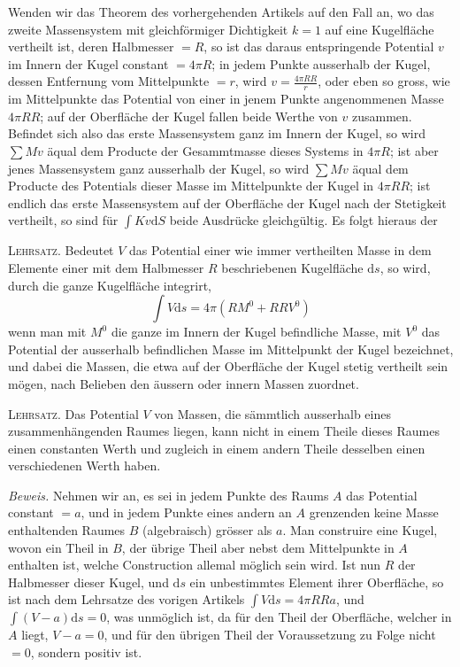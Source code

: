 Wenden wir das Theorem des vorhergehenden Artikels auf den Fall an, wo das zweite Massensystem mit gleichförmiger Dichtigkeit $k=1$ auf eine Kugelfläche vertheilt ist, deren Halbmesser $=R$, so ist das daraus entspringende Potential $v$ im Innern der Kugel constant $=4\pi R$; in jedem Punkte ausserhalb der Kugel, dessen Entfernung vom Mittelpunkte $=r$, wird $v=\frac{4\pi RR}{r}$, oder eben so gross, wie im Mittelpunkte das Potential von einer in jenem Punkte angenommenen Masse $4\pi RR$; auf der Oberfläche der Kugel fallen beide Werthe von $v$ zusammen. Befindet sich also das erste Massensystem ganz im Innern der Kugel, so wird $\sum Mv$ äqual dem Producte der Gesammtmasse dieses Systems in $4\pi R$; ist aber jenes Massensystem ganz ausserhalb der Kugel, so wird $\sum Mv$ äqual dem Producte des Potentials dieser Masse im Mittelpunkte der Kugel in $4\pi RR$; ist endlich das erste Massensystem auf der Oberfläche der Kugel nach der Stetigkeit vertheilt, so sind für $\int Kv\mathrm dS$ beide Ausdrücke gleichgültig. Es folgt hieraus der

\textsc{Lehrsatz.} Bedeutet $V$ das Potential einer wie immer vertheilten Masse in dem Elemente einer mit dem Halbmesser $R$ beschriebenen Kugelfläche $\mathrm ds$, so wird, durch die ganze Kugelfläche integrirt,
\[
\int V\mathrm ds=4\pi(RM^0+RRV^0)
\]
wenn man mit $M^0$ die ganze im Innern der Kugel befindliche Masse, mit $V^0$ das Potential der ausserhalb befindlichen Masse im Mittelpunkt der Kugel bezeichnet, und dabei die Massen, die etwa auf der Oberfläche der Kugel stetig vertheilt sein mögen, nach Belieben den äussern oder innern Massen zuordnet.

%
\textsc{Lehrsatz.} Das Potential $V$ von Massen, die sämmtlich ausserhalb eines zusammenhängenden Raumes liegen, kann nicht in einem Theile dieses Raumes einen constanten Werth und zugleich in einem andern Theile desselben einen verschiedenen Werth haben.

\textit{Beweis.} Nehmen wir an, es sei in jedem Punkte des Raums $A$ das Potential constant $=a$, und in jedem Punkte eines andern an $A$ grenzenden keine Masse enthaltenden Raumes $B$ (algebraisch) grösser als $a$. Man construire eine Kugel, wovon ein Theil in $B$, der übrige Theil aber nebst dem Mittelpunkte in $A$ enthalten ist, welche Construction allemal möglich sein wird. Ist nun $R$ der Halbmesser dieser Kugel, und $\mathrm ds$ ein unbestimmtes Element ihrer Oberfläche, so ist nach dem Lehrsatze des vorigen Artikels $\int V\mathrm ds=4\pi RRa$, und $\int(V-a)\mathrm ds=0$, was unmöglich ist, da für den Theil der Oberfläche, welcher in $A$ liegt, $V-a=0$, und für den übrigen Theil der Voraussetzung zu Folge nicht $=0$, sondern positiv ist.

